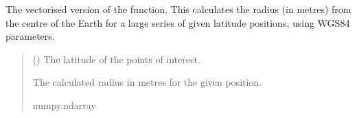 \documentclass[letterpaper,10pt,english]{sphinxmanual}
\begin{document}

\begin{fulllineitems}
\label{\detokenize{modules/util/transformations:qnav.util.transformations.radius84_vec}}
\pysigstartsignatures
{}
\pysigstopsignatures
\sphinxAtStartPar
The vectorised version of the
{\hyperref[\detokenize{modules/util/transformations:qnav.util.transformations.radius84}]{}} function. This
calculates the radius (in metres) from the centre of the Earth for a large
series of given latitude positions, using WGS84 parameters.
\begin{quote}\begin{description}
\sphinxAtStartPar
{} () \textendash{} The latitude of the points of interest.

\sphinxAtStartPar
The calculated radius in metres for the given position.

\sphinxAtStartPar
numpy.ndarray

\end{description}\end{quote}

\end{fulllineitems}

\end{document}
